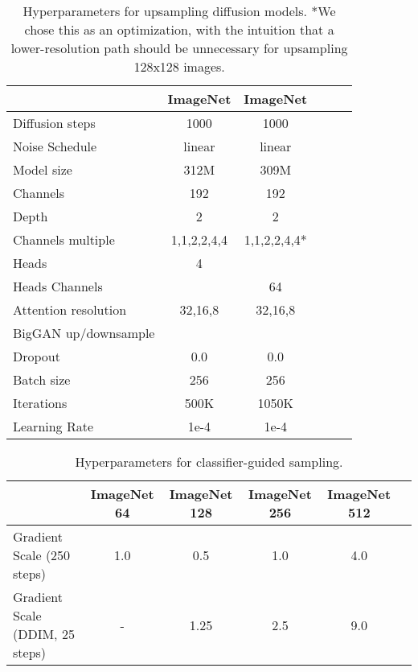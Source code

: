 \documentclass{article}
\newcommand{\cmark}{\ding{51}}\newcommand{\xmark}{\ding{55}}
\begin{document}
\begin{table}[h]
    \setlength\tabcolsep{4pt}
    \begin{center}
    \begin{small}
    \begin{tabular}{lccccc}
    \toprule
     & ImageNet  & ImageNet \\
    \midrule
    Diffusion steps & 1000 & 1000 \\
    Noise Schedule & linear & linear \\
    Model size & 312M & 309M & \\
    Channels & 192 & 192 \\
    Depth & 2 & 2 \\
    Channels multiple & 1,1,2,2,4,4 & 1,1,2,2,4,4* \\
    Heads & 4 & \\
    Heads Channels & & 64 \\
    Attention resolution & 32,16,8 & 32,16,8 \\
    BigGAN up/downsample & \cmark & \cmark \\
    Dropout & 0.0 & 0.0 \\
    Batch size & 256 & 256 \\
    Iterations & 500K & 1050K \\
    Learning Rate & 1e-4 & 1e-4 \\
    \bottomrule
    \end{tabular}
    \end{small}
    \end{center}
    \caption{Hyperparameters for upsampling diffusion models. *We chose this as an optimization, with the intuition that a lower-resolution path should be unnecessary for upsampling 128x128 images.}
    \label{tab:hpsupsample}
    \vskip -0.2in
\end{table}

\begin{table}[h]
    \begin{center}
    \begin{small}
    \begin{tabular}{lccccc}
    \toprule
    & ImageNet 64 & ImageNet 128 & ImageNet 256 & ImageNet 512 \\
    \midrule
    Gradient Scale (250 steps) & 1.0 & 0.5 & 1.0 & 4.0 \\
    Gradient Scale (DDIM, 25 steps) & - & 1.25 & 2.5 & 9.0 \\
    \bottomrule
    \end{tabular}
    \end{small}
    \end{center}
    \caption{Hyperparameters for classifier-guided sampling.}
    \label{tab:hpguided}
    \vskip -0.2in
\end{table}
\end{document}
